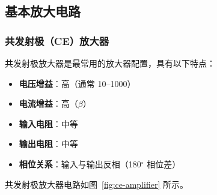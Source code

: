 \subsection{基本放大电路}

\subsubsection{共发射极（CE）放大器}

共发射极放大器是最常用的放大器配置，具有以下特点：

\begin{itemize}
  \item \textbf{电压增益}：高（通常 10--1000）
  \item \textbf{电流增益}：高（$\beta$）
  \item \textbf{输入电阻}：中等
  \item \textbf{输出电阻}：中等
  \item \textbf{相位关系}：输入与输出反相（180$^\circ$ 相位差）
\end{itemize}

共发射极放大器电路如图~\ref{fig:ce-amplifier} 所示。

